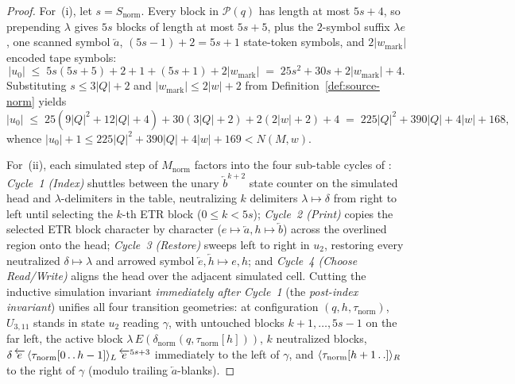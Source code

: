 \documentclass[11pt,reqno]{amsart}
\numberwithin{equation}{section}
\theoremstyle{plain}
\theoremstyle{definition}
\theoremstyle{remark}
\begin{document}
\begin{proof}
For~(i), let $s = S_{\mathrm{norm}}$. Every block in $\mathcal{P}(q)$ has length at most $5s + 4$, so prepending $\lambda$ gives $5s$ blocks of length at most $5s + 5$, plus the $2$-symbol suffix $\lambda e$, one scanned symbol $\overleftarrow{a}$, $(5s - 1) + 2 = 5s + 1$ state-token symbols, and $2|w_{\mathrm{mark}}|$ encoded tape symbols:
\[
  |u_0| \;\le\; 5s(5s + 5) + 2 + 1 + (5s + 1) + 2|w_{\mathrm{mark}}| \;=\; 25s^2 + 30s + 2|w_{\mathrm{mark}}| + 4.
\]
Substituting $s \le 3|Q| + 2$ and $|w_{\mathrm{mark}}| \le 2|w| + 2$ from Definition~\ref{def:source-norm} yields
\[
  |u_0| \;\le\; 25(9|Q|^2 + 12|Q| + 4) + 30(3|Q| + 2) + 2(2|w| + 2) + 4 \;=\; 225|Q|^2 + 390|Q| + 4|w| + 168,
\]
whence $|u_0| + 1 \le 225|Q|^2 + 390|Q| + 4|w| + 169 < N(M,w)$.

For~(ii), each simulated step of $M_{\mathrm{norm}}$ factors into the four sub-table cycles of \cite{NearyWoods2006SmallFast,Neary2008Thesis}: \emph{Cycle~1 (Index)} shuttles between the unary $\overleftarrow{b}^{k+2}$ state counter on the simulated head and $\lambda$-delimiters in the table, neutralizing $k$ delimiters $\lambda \mapsto \delta$ from right to left until selecting the $k$-th ETR block ($0 \le k < 5s$); \emph{Cycle~2 (Print)} copies the selected ETR block character by character ($e \mapsto \overleftarrow{a}, h \mapsto \overleftarrow{b}$) across the overlined region onto the head; \emph{Cycle~3 (Restore)} sweeps left to right in $u_2$, restoring every neutralized $\delta \mapsto \lambda$ and arrowed symbol $\overleftarrow{e}, \overleftarrow{h} \mapsto e, h$; and \emph{Cycle~4 (Choose Read/Write)} aligns the head over the adjacent simulated cell. Cutting the inductive simulation invariant \emph{immediately after Cycle~1} (the \emph{post-index invariant}) unifies all four transition geometries: at configuration $(q, h, \tau_{\mathrm{norm}})$, $U_{3,11}$ stands in state $u_2$ reading $\gamma$, with untouched blocks $k+1, \dots, 5s-1$ on the far left, the active block $\lambda\,E(\delta_{\mathrm{norm}}(q, \tau_{\mathrm{norm}}[h]))$, $k$ neutralized blocks, $\delta\,\overleftarrow{e}\,\langle \tau_{\mathrm{norm}}[0\mathinner{\ldotp\ldotp}h-1] \rangle_L\,\overleftarrow{e}^{5s+3}$ immediately to the left of $\gamma$, and $\langle \tau_{\mathrm{norm}}[h+1\mathinner{\ldotp\ldotp}] \rangle_R$ to the right of $\gamma$ (modulo trailing $\overleftarrow{a}$-blanks).


\end{proof}
\end{document}
